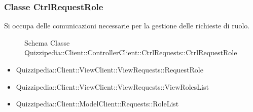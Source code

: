 \subsubsection{Classe CtrlRequestRole}
Si occupa delle comunicazioni necessarie per la gestione delle richieste di ruolo.
\begin{figure}[H]
\centering
\noindent{}
\caption[Schema Classe CtrlRequestRole]{Schema Classe Quizzipedia::Client::ControllerClient::CtrlRequests::CtrlRequestRole}
\end{figure}
\begin{itemize}
\item Quizzipedia::Client::ViewClient::ViewRequests::RequestRole
\item Quizzipedia::Client::ViewClient::ViewRequests::ViewRolesList
\end{itemize}
\begin{itemize}
\item Quizzipedia::Client::ModelClient::Requests::RoleList
\end{itemize}
